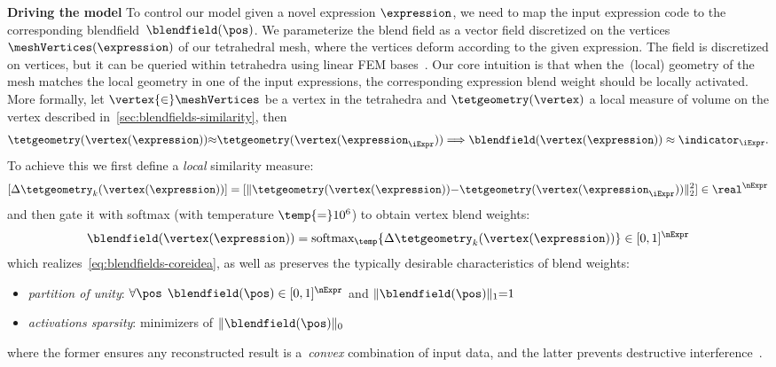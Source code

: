     \noindent\textbf{Driving the model}
    To control our model given a novel expression $\expression$, we need to
    map the input expression code to the corresponding
    blendfield~$\blendfield(\pos)$.
    We parameterize the blend field as a vector field discretized on the
    vertices $\meshVertices(\expression)$ of our tetrahedral mesh, where the
    vertices deform according to the given expression.
    The field is discretized on vertices, but it can be queried within
    tetrahedra using linear FEM bases~\cite{monk2003finite}.
    Our core intuition is that when the~(local) geometry of the mesh matches
    the local geometry in one of the input expressions, the corresponding
    expression blend weight should be locally activated.
    More formally, let $\vertex{\in} \meshVertices$ be a vertex in the tetrahedra and $\tetgeometry(\vertex)$ a local measure of volume on the vertex described in~\cref{sec:blendfields-similarity}, then
    \begin{align}
      \tetgeometry(\vertex(\expression)) {\approx} \tetgeometry(\vertex(\expression_\iExpr))
      \Longrightarrow
      \blendfield(\vertex(\expression)) \approx \indicator_\iExpr.
      \label{eq:blendfields-coreidea}
    \end{align}
    To achieve this we first define a \textit{local} similarity measure:
    \begin{equation}
      \label{eq:blendfields-local-similarity}
      [ \Delta\tetgeometry_k(\vertex(\expression))] = [ \| \tetgeometry(\vertex(\expression)) {-} \tetgeometry(\vertex(\expression_\iExpr))\|_2^2 ] \in \real^{\nExpr}
    \end{equation}
    and then gate it with softmax (with temperature $\temp{=}10^6$) to obtain vertex blend weights:
    \begin{align}
      \label{eq:blendfields-blendfield}
      \blendfield(\vertex(\expression)) = \text{softmax}_\temp \{ \Delta\tetgeometry_k(\vertex(\expression)) \} \in [0,1]^{\nExpr}
    \end{align}
    which realizes~\cref{eq:blendfields-coreidea}, as well as preserves the typically desirable characteristics of blend weights:
    \begin{itemize}
      \item \textit{partition of unity}: $\forall\pos \:\: \blendfield(\pos) \in [0,1]^\nExpr$ and $\| \blendfield(\pos) \|_1{=}1$
      \item \textit{activations sparsity}: minimizers of $\|\blendfield(\pos)\|_0$
    \end{itemize}
    where the former ensures any reconstructed result is a~\textit{convex} combination of input data, and the latter prevents destructive interference~\cite{ichim2015dynamic}.

